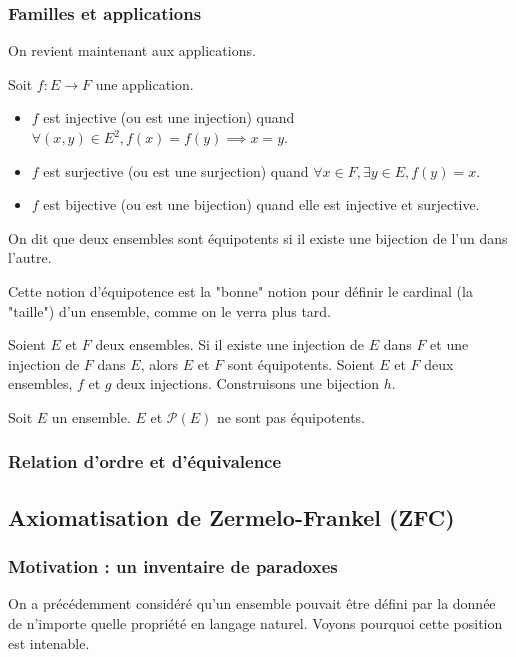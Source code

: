 \subsubsection{Familles et applications}

On revient maintenant aux applications.
\begin{defini}
	Soit $f: E \to F$ une application.
	\begin{itemize}
		\item $f$ est injective (ou est une injection) quand $\forall (x,y) \in E^2, f(x)=f(y) \implies x=y$.
		\item $f$ est surjective (ou est une surjection) quand $\forall x \in F, \exists y \in E, f(y)=x$.
		\item $f$ est bijective (ou est une bijection) quand elle est injective et surjective.
	\end{itemize}
\end{defini}

\begin{defini}
	On dit que deux ensembles sont équipotents si il existe une bijection de l'un dans l'autre.
\end{defini}

Cette notion d'équipotence est la "bonne" notion pour définir le cardinal (la "taille") d'un ensemble, comme on le verra plus tard.  

\begin{theoreme}
	Soient $E$ et $F$ deux ensembles. Si il existe une injection de $E$ dans $F$ et une injection de $F$ dans $E$, alors $E$ et $F$ sont équipotents.
	\tcblower
	Soient $E$ et $F$ deux ensembles, $f$ et $g$ deux injections. Construisons une bijection $h$.

	
\end{theoreme}

\begin{theoreme}
	Soit $E$ un ensemble. $E$ et $\mathcal{P}(E)$ ne sont pas équipotents.
\end{theoreme}

\subsubsection{Relation d'ordre et d'équivalence}

\subsection{Axiomatisation de Zermelo-Frankel (ZFC)}
\subsubsection{Motivation : un inventaire de paradoxes}
On a précédemment considéré qu'un ensemble pouvait être défini par la donnée de n'importe quelle propriété en langage naturel. Voyons pourquoi cette position est intenable.

